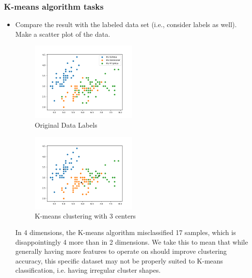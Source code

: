\documentclass[a4paper]{article}
\begin{document}
	\subsubsection{K-means algorithm tasks}
	\begin{itemize}
		\item Compare the result with the labeled data set (i.e., consider labels as well). Make a scatter plot of the data.
		
	\begin{figure}[h]
		\begin{center}
			\includegraphics[width=0.5\textwidth]{4dim_data.png}
			\caption{Original Data Labels}
		\end{center}
	\end{figure}

	\begin{figure}[h]
		\begin{center}
			\includegraphics[width=0.5\textwidth]{kmeans_4dim.png}
			\caption{K-means clustering with 3 centers}
		\end{center}
	\end{figure}
	
	In 4 dimensions, the K-means algorithm misclassified 17 samples, which is disappointingly 4 more than in 2 dimensions.  We take this to mean that while generally having more features to operate on should improve clustering accuracy, this specific dataset may not be properly suited to K-means classification, i.e. having irregular cluster shapes.

\clearpage


\end{itemize}
\end{document}
